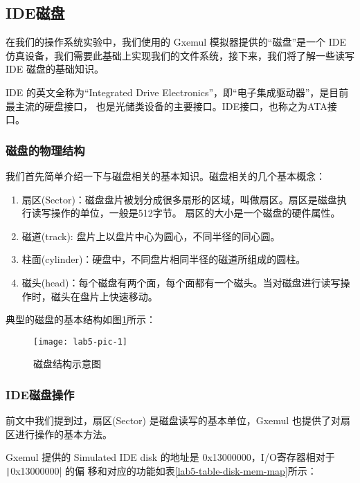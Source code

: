\subsection{IDE磁盘}

在我们的操作系统实验中，我们使用的 Gxemul 模拟器提供的“磁盘”是一个 IDE 仿真设备，我们需要此基础上实现我们的文件系统，接下来，我们将了解一些读写 IDE 磁盘的基础知识。

\begin{note}
IDE 的英文全称为“Integrated Drive Electronics”，即“电子集成驱动器”，是目前最主流的硬盘接口， 也是光储类设备的主要接口。IDE接口，也称之为ATA接口。
\end{note}

\subsubsection{磁盘的物理结构}

我们首先简单介绍一下与磁盘相关的基本知识。磁盘相关的几个基本概念：

\begin{enumerate}
  \item 扇区(Sector)：磁盘盘片被划分成很多扇形的区域，叫做扇区。扇区是磁盘执行读写操作的单位，一般是512字节。
  扇区的大小是一个磁盘的硬件属性。
  \item 磁道(track): 盘片上以盘片中心为圆心，不同半径的同心圆。
  \item 柱面(cylinder)：硬盘中，不同盘片相同半径的磁道所组成的圆柱。
  \item 磁头(head)：每个磁盘有两个面，每个面都有一个磁头。当对磁盘进行读写操作时，磁头在盘片上快速移动。
\end{enumerate}

典型的磁盘的基本结构如图\ref{lab5-pic-1}所示：

\begin{figure}[htbp]
  \centering
  \texttt{[image: lab5-pic-1]}
  \caption{磁盘结构示意图}\label{lab5-pic-1}
\end{figure}

\subsubsection{IDE磁盘操作}

前文中我们提到过，扇区(Sector)
是磁盘读写的基本单位，Gxemul 也提供了对扇区进行操作的基本方法。

Gxemul 提供的 Simulated IDE disk 的地址是 0x13000000，I/O寄存器相对于 \texttt|0x13000000| 的偏
移和对应的功能如表\ref{lab5-table-disk-mem-map}所示：

